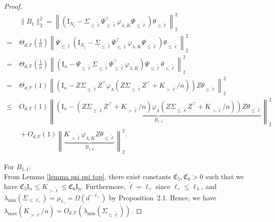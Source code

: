 \documentclass{article}
\theoremstyle{plain}
\theoremstyle{definition}
\theoremstyle{remark}
\newcommand{\reg}{\varphi_\lambda}
\begin{document}
\begin{appendix}
\begin{proof}
\begin{equation}\label{eqn_b1_spe_origin}
    \begin{aligned}
                &~\|B_1\|_{2}^{2} = 
                \left\| \left( \mathrm{I}_{N_{\tilde{\ell}}} - \Sigma_{\leq \tilde{\ell}} \Psi^{\top}_{\leq \tilde{\ell}} \varphi_{\lambda, K} \Psi_{\leq \tilde{\ell}}\right)    \theta_{\leq \tilde{\ell}} \right\|_{2}^{2}\\
                =&~ 
                \Theta_{d, \mathbb{P}}\left(\frac{1}{n}\right)
                \left\| \Psi_{\leq \tilde{\ell}}\left( \mathrm{I}_{N_{\tilde{\ell}}} - \Sigma_{\leq \tilde{\ell}} \Psi^{\top}_{\leq \tilde{\ell}} \varphi_{\lambda, K} \Psi_{\leq \tilde{\ell}}\right)    \theta_{\leq \tilde{\ell}} \right\|_{2}^{2}\\
                =&~ 
                \Theta_{d, \mathbb{P}}\left(\frac{1}{n}\right)
                \left\| \left( \mathrm{I}_{n} - \Psi_{\leq \tilde{\ell}}\Sigma_{\leq \tilde{\ell}} \Psi^{\top}_{\leq \tilde{\ell}} \varphi_{\lambda, K} \right) 
                \Psi_{\leq \tilde{\ell}}\theta_{\leq \tilde{\ell}} \right\|_{2}^{2}\\
                {=}&~
        \Theta_{d, \mathbb{P}}\left(1\right)
        \left\| \left( \mathrm{I}_n - Z\Sigma_{\leq \tilde{\ell}} Z^{\top} \reg(Z\Sigma_{\leq \tilde{\ell}} Z^{\top} +K_{>\tilde{\ell}}/n) \right) 
                Z\theta_{\leq \tilde{\ell}} \right\|_{2}^{2}\\
                {\leq}&~
        O_{d, \mathbb{P}}\left(1\right)\left\| \underbrace{\left( \mathrm{I}_n - (Z\Sigma_{\leq \tilde{\ell}} Z^{\top} +K_{>\tilde{\ell}}/n) \reg(Z\Sigma_{\leq \tilde{\ell}} Z^{\top} +K_{>\tilde{\ell}}/n) \right) 
                Z\theta_{\leq \tilde{\ell}} }_{B_{1, 1}}\right\|_{2}^{2}\\
                &~+
                O_{d, \mathbb{P}}\left(1\right)\left\| \underbrace{K_{>\tilde{\ell}} 
                \varphi_{\lambda, K}
                Z
                \theta_{\leq \tilde{\ell}} }_{B_{1, 2}}\right\|_{2}^{2}.
    \end{aligned}
\end{equation}

For $B_{1,1}$:\\
From Lemma \ref{lemma psi psi top}, there exist constants $\mathfrak{C}_5, \mathfrak{C}_6 >0$ such that we have $\mathfrak{C}_5 \mathrm{I}_n \leq K_{>\tilde{\ell}} \leq \mathfrak{C}_6 \mathrm{I}_n$. 
Furthermore, $\tilde{\ell}=\ell_{\gamma}$ since $\ell_{\gamma} \leq \ell_{\lambda}$, and $\lambda_{\min}(\Sigma_{\leq \ell_{\gamma}})=\mu_{\ell_{\gamma}}=\Omega(d^{-\ell_{\gamma}})$ by Proposition~2.1. 
Hence, we have $\lambda_{\max}(K_{>\tilde{\ell}}/n)=O_{d, \mathbb{P}}\left(\lambda_{\min}(\Sigma_{\leq \tilde{\ell}})\right)$. 


\end{proof}
\end{appendix}
\end{document}

